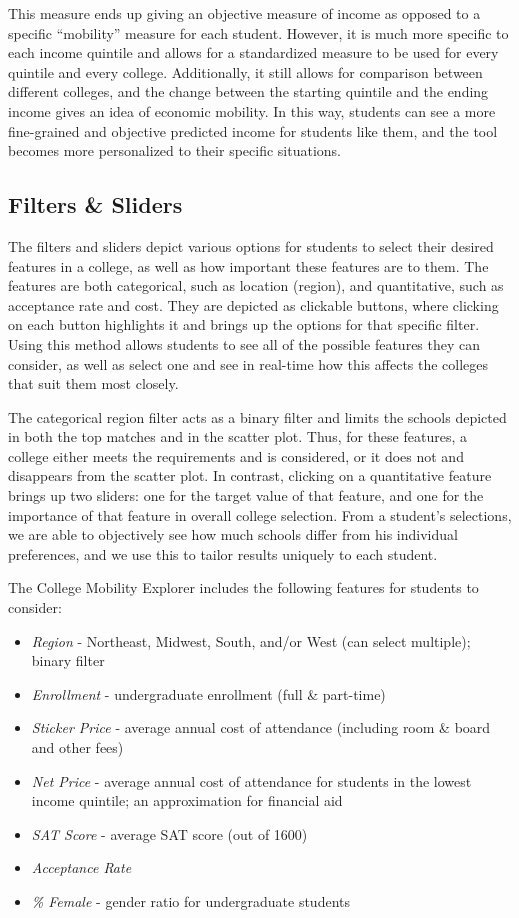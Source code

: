 \documentclass{vgtc}
\begin{document}
This measure ends up giving an objective measure of income as opposed to a specific ``mobility'' measure for each student. However, it is much more specific to each income quintile and allows for a standardized measure to be used for every quintile and every college. Additionally, it still allows for comparison between different colleges, and the change between the starting quintile and the ending income gives an idea of economic mobility. In this way, students can see a more fine-grained and objective predicted income for students like them, and the tool becomes more personalized to their specific situations. 

\subsection{Filters \& Sliders}
The filters and sliders depict various options for students to select their desired features in a college, as well as how important these features are to them. The features are both categorical, such as location (region), and quantitative, such as acceptance rate and cost. They are depicted as clickable buttons, where clicking on each button highlights it and brings up the options for that specific filter. Using this method allows students to see all of the possible features they can consider, as well as select one and see in real-time how this affects the colleges that suit them most closely.

The categorical region filter acts as a binary filter and limits the schools depicted in both the top matches and in the scatter plot. Thus, for these features, a college either meets the requirements and is considered, or it does not and disappears from the scatter plot. In contrast, clicking on a quantitative feature brings up two sliders: one for the target value of that feature, and one for the importance of that feature in overall college selection. From a student's selections, we are able to objectively see how much schools differ from his individual preferences, and we use this to tailor results uniquely to each student.

The College Mobility Explorer includes the following features for students to consider:
\begin{itemize}
    \item \textit{Region} - Northeast, Midwest, South, and/or West (can select multiple); binary filter
    \item \textit{Enrollment} - undergraduate enrollment (full \& part-time)
    \item \textit{Sticker Price} - average annual cost of attendance (including room \& board and other fees)
    \item \textit{Net Price} - average annual cost of attendance for students in the lowest income quintile; an approximation for financial aid
    \item \textit{SAT Score} - average SAT score (out of 1600)
    \item \textit{Acceptance Rate}
    \item \textit{\% Female} -  gender ratio for undergraduate students
\end{itemize}
\end{document}
